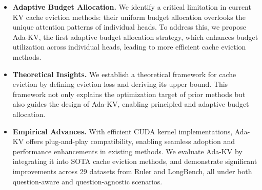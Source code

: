 \begin{itemize}
  \item {\bf Adaptive Budget Allocation.}
  We identify a critical limitation in current KV cache eviction methods: their uniform budget allocation overlooks the unique attention patterns of individual heads. To address this, we propose Ada-KV, the first adaptive budget allocation strategy, which enhances budget utilization across individual heads, leading to more efficient cache eviction methods.

  
  \item {\bf Theoretical Insights.}
  We establish a theoretical framework for cache eviction by defining eviction loss and deriving its upper bound. This framework not only explains the optimization target of prior methods but also guides the design of Ada-KV, enabling principled and adaptive budget allocation.
  
  \item {\bf Empirical Advances.}
  With efficient CUDA kernel implementations, Ada-KV offers plug-and-play compatibility, enabling seamless adoption and performance enhancements in existing methods.
  We evaluate Ada-KV by integrating it into SOTA cache eviction methods, and demonstrate significant improvements across 29 datasets from Ruler and LongBench, all under both question-aware and question-agnostic scenarios.
  
\end{itemize}







